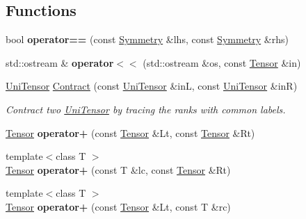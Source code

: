 \subsection*{Functions}
\begin{DoxyCompactItemize}
\item 
\mbox{\label{namespacecytnx_ae6b20189964ca74ff03eb7565dc0b8cd}} 
bool {\bfseries operator==} (const \hyperlink{classcytnx_1_1Symmetry}{Symmetry} \&lhs, const \hyperlink{classcytnx_1_1Symmetry}{Symmetry} \&rhs)
\item 
\mbox{\label{namespacecytnx_a651e9fae9c180966bc3655999e473a78}} 
std\+::ostream \& {\bfseries operator$<$$<$} (std\+::ostream \&os, const \hyperlink{classcytnx_1_1Tensor}{Tensor} \&in)
\item 
\hyperlink{classcytnx_1_1UniTensor}{Uni\+Tensor} \hyperlink{namespacecytnx_aff129ee03a89358da36c843e471a8ef2}{Contract} (const \hyperlink{classcytnx_1_1UniTensor}{Uni\+Tensor} \&inL, const \hyperlink{classcytnx_1_1UniTensor}{Uni\+Tensor} \&inR)
\begin{DoxyCompactList}\small\item\em Contract two \hyperlink{classcytnx_1_1UniTensor}{Uni\+Tensor} by tracing the ranks with common labels. \end{DoxyCompactList}\item 
\mbox{\label{namespacecytnx_a067e7063e7cc7a80c9c91d8998ab7134}} 
\hyperlink{classcytnx_1_1Tensor}{Tensor} {\bfseries operator+} (const \hyperlink{classcytnx_1_1Tensor}{Tensor} \&Lt, const \hyperlink{classcytnx_1_1Tensor}{Tensor} \&Rt)
\item 
\mbox{\label{namespacecytnx_a75a3787e9b9565f0bc90d19453d1ffa5}} 
{\footnotesize template$<$class T $>$ }\\\hyperlink{classcytnx_1_1Tensor}{Tensor} {\bfseries operator+} (const T \&lc, const \hyperlink{classcytnx_1_1Tensor}{Tensor} \&Rt)
\item 
\mbox{\label{namespacecytnx_a9b46a4945621a40fc5e23bbea0576b1a}} 
{\footnotesize template$<$class T $>$ }\\\hyperlink{classcytnx_1_1Tensor}{Tensor} {\bfseries operator+} (const \hyperlink{classcytnx_1_1Tensor}{Tensor} \&Lt, const T \&rc)
\item 

\end{DoxyCompactItemize}
